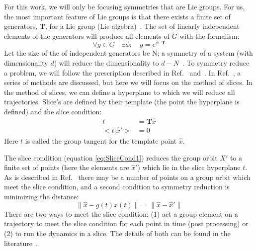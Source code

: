 \documentclass[12 pt]{article}
\begin{document}
For this work, we will only be focusing symmetries that are Lie groups.
For us, the most important feature of Lie groups is that there exists a
finite set of generators, $\mathbf{T}$, for a Lie group (Lie
algebra)~\cite{CB}.  The set of linearly independent elements of the
generators will produce all elements of $G$ with the formalism:
\begin{equation}
\forall g \in G \quad \exists \phi: \quad  g = e^{\phi \cdot \mathbf{T}}
\label{eq:SymmGen}
\end{equation}
Let the size of the of independent generators be N; a symmetry of a
system (with dimensionality $d$) will reduce the dimensionality to
$d-N$~\cite{Atl}.
To symmetry reduce a problem, we will follow the prescription described
in Ref.~\cite{SliceCond} and~\cite{Atl}.  In Ref.~\cite{Atl}, a series of
methods are discussed, but here we will focus on the method of slices.
In the method of slices, we can define a hyperplane to which we will
reduce all trajectories. Slice's are defined by their template (the point
the hyperplane is defined) and the slice condition:
\begin{equation}
\begin{split}
t &= \mathbf{T}  \hat{x} \\
<t|\hat{x}'> &= 0
\label{eq:SliceCond1}
\end{split}
\end{equation}
Here $t$ is called the group tangent for the template point $\hat{x}$.

The slice condition (equation \ref{eq:SliceCond1}) reduces the group
orbit ${X'}$ to a finite set of points (here the elements are
${\hat{x}'}$) which lie in the slice hyperplane $t$.  As is described in
Ref.~\cite{SliceCond} there may be a number of points on a group orbit
which meet the slice condition, and a second condition to symmetry
reduction is minimizing the distance:
\begin{equation}
\parallel \hat{x}-g(t)x(t) \parallel = \parallel \hat{x}-\hat{x}' \parallel
\label{eq:SliceCond2}
\end{equation}
There are two ways to meet the slice condition: (1) act a group element
on a trajectory to meet the slice condition for each point in time (post
processing) or (2) to run the dynamics in a slice.  The details of both
can be found in the literature~\cite{CB,Eth, SliceCond, Atl}.
\end{document}
